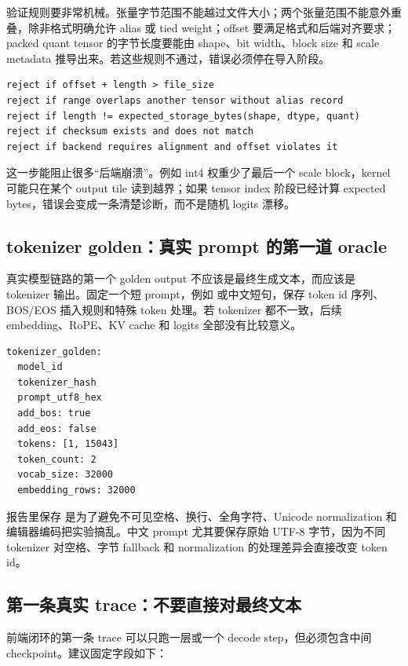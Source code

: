 验证规则要非常机械。张量字节范围不能越过文件大小；两个张量范围不能意外重叠，除非格式明确允许 alias 或 tied weight；offset 要满足格式和后端对齐要求；packed quant tensor 的字节长度要能由 shape、bit width、block size 和 scale metadata 推导出来。若这些规则不通过，错误必须停在导入阶段。

\begin{lstlisting}[numbers=none,caption={字节范围 verifier 的拒绝条件}]
reject if offset + length > file_size
reject if range overlaps another tensor without alias record
reject if length != expected_storage_bytes(shape, dtype, quant)
reject if checksum exists and does not match
reject if backend requires alignment and offset violates it
\end{lstlisting}

这一步能阻止很多“后端崩溃”。例如 int4 权重少了最后一个 scale block，kernel 可能只在某个 output tile 读到越界；如果 tensor index 阶段已经计算 expected bytes，错误会变成一条清楚诊断，而不是随机 logits 漂移。

\subsection{tokenizer golden：真实 prompt 的第一道 oracle}

真实模型链路的第一个 golden output 不应该是最终生成文本，而应该是 tokenizer 输出。固定一个短 prompt，例如  或中文短句，保存 token id 序列、BOS/EOS 插入规则和特殊 token 处理。若 tokenizer 都不一致，后续 embedding、RoPE、KV cache 和 logits 全部没有比较意义。

\begin{lstlisting}[numbers=none,caption={tokenizer golden 报告}]
tokenizer_golden:
  model_id
  tokenizer_hash
  prompt_utf8_hex
  add_bos: true
  add_eos: false
  tokens: [1, 15043]
  token_count: 2
  vocab_size: 32000
  embedding_rows: 32000
\end{lstlisting}

报告里保存  是为了避免不可见空格、换行、全角字符、Unicode normalization 和编辑器编码把实验搞乱。中文 prompt 尤其要保存原始 UTF-8 字节，因为不同 tokenizer 对空格、字节 fallback 和 normalization 的处理差异会直接改变 token id。

\subsection{第一条真实 trace：不要直接对最终文本}

前端闭环的第一条 trace 可以只跑一层或一个 decode step，但必须包含中间 checkpoint。建议固定字段如下：

